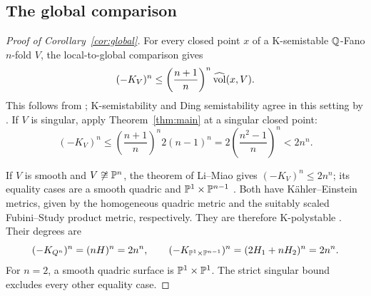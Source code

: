 \subsection{The global comparison}

\begin{proof}[Proof of Corollary~\ref{cor:global}]
For every closed point \(x\) of a K-semistable
\(\mathbb Q\)-Fano \(n\)-fold \(V\), the local-to-global
comparison gives
\[
                    (-K_V)^n
                    \le\left(\frac{n+1}{n}\right)^n
                         \widehat{\operatorname{vol}}(x,V).
\]
This follows from \cite[Theorem~21]{Liu18};
K-semistability and Ding semistability agree in
this setting by \cite[Theorem~13(2)]{Liu18}.
If \(V\) is singular, apply
Theorem~\ref{thm:main} at a singular closed point:
\[
 (-K_V)^n\le
 \left(\frac{n+1}{n}\right)^n2(n-1)^n
 =2\left(\frac{n^2-1}{n}\right)^n<2n^n.
\]

If \(V\) is smooth and \(V\not\cong\mathbb P^n\), the
theorem of Li--Miao gives \((-K_V)^n\le2n^n\);
its equality cases are a smooth quadric and
\(\mathbb P^1\times\mathbb P^{n-1}\)
\cite[Theorem~1.1]{LM25}.
Both have Kähler--Einstein metrics, given by the homogeneous
quadric metric and the suitably scaled Fubini--Study product metric,
respectively. They are therefore K-polystable
\cite[Theorem~1.1]{Berman16}. Their degrees are
\[
 (-K_{Q^n})^n=(nH)^n=2n^n,\qquad
 (-K_{\mathbb P^1\times\mathbb P^{n-1}})^n
                =(2H_1+nH_2)^n=2n^n.
\]
For \(n=2\), a smooth quadric surface is
\(\mathbb P^1\times\mathbb P^1\). The strict singular bound
excludes every other equality case.
\end{proof}
